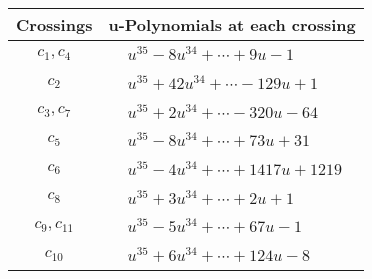 \documentclass[1p]{elsarticle_modified}
\theoremstyle{definition}
\begin{document}
\begin{tabular}{m{50pt}|m{274pt}}
Crossings & \hspace{64pt}u-Polynomials at each crossing \\
\hline $$\begin{aligned}c_{1},c_{4}\end{aligned}$$&$\begin{aligned}
&u^{35}-8 u^{34}+\cdots+9 u-1
\end{aligned}$\\
\hline $$\begin{aligned}c_{2}\end{aligned}$$&$\begin{aligned}
&u^{35}+42 u^{34}+\cdots-129 u+1
\end{aligned}$\\
\hline $$\begin{aligned}c_{3},c_{7}\end{aligned}$$&$\begin{aligned}
&u^{35}+2 u^{34}+\cdots-320 u-64
\end{aligned}$\\
\hline $$\begin{aligned}c_{5}\end{aligned}$$&$\begin{aligned}
&u^{35}-8 u^{34}+\cdots+73 u+31
\end{aligned}$\\
\hline $$\begin{aligned}c_{6}\end{aligned}$$&$\begin{aligned}
&u^{35}-4 u^{34}+\cdots+1417 u+1219
\end{aligned}$\\
\hline $$\begin{aligned}c_{8}\end{aligned}$$&$\begin{aligned}
&u^{35}+3 u^{34}+\cdots+2 u+1
\end{aligned}$\\
\hline $$\begin{aligned}c_{9},c_{11}\end{aligned}$$&$\begin{aligned}
&u^{35}-5 u^{34}+\cdots+67 u-1
\end{aligned}$\\
\hline $$\begin{aligned}c_{10}\end{aligned}$$&$\begin{aligned}
&u^{35}+6 u^{34}+\cdots+124 u-8
\end{aligned}$\\
\hline
\end{tabular}\\~\\
\end{document}
